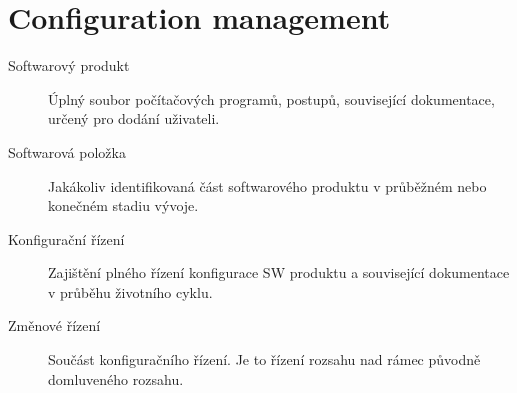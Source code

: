 \section{Configuration management}
\begin{description}
  \item[Softwarový produkt] Úplný soubor počítačových programů, postupů, související dokumentace, určený pro dodání uživateli.
  \item[Softwarová položka] Jakákoliv identifikovaná část softwarového produktu v průběžném nebo konečném stadiu vývoje.
  \item[Konfigurační řízení] Zajištění plného řízení konfigurace SW produktu a související dokumentace v průběhu životního cyklu.
  \item[Změnové řízení] Součást konfiguračního řízení. Je to řízení rozsahu nad rámec původně domluveného rozsahu.
\end{description}
